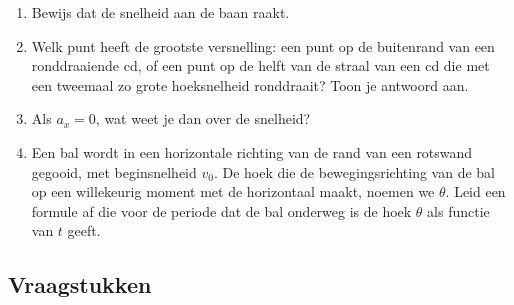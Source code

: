 \begin{enumerate}
\item Bewijs dat de snelheid aan de baan raakt.







\item Welk punt heeft de grootste versnelling: een punt op de buitenrand van een ronddraaiende cd, of een punt op de helft van de straal van een cd die met een tweemaal zo grote hoeksnelheid ronddraait? Toon je antwoord aan.

\item Als $a_x=0$, wat weet je dan over de snelheid?

\item Een bal wordt in een horizontale richting van de rand van een rotswand gegooid, met beginsnelheid $v_0$. De hoek die de bewegingsrichting van de bal op een willekeurig moment met de horizontaal maakt, noemen we $\theta$. Leid een formule af die voor de periode dat de bal onderweg is de hoek $\theta$ als functie van $t$ geeft.



\end{enumerate}

\subsection{Vraagstukken}

